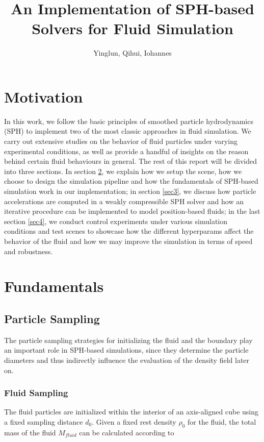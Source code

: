 \documentclass[
	11pt, 
	DIV10,
	ngerman,
	a4paper, 
	oneside, 
	headings=normal, 
	captions=tableheading,
	final, 
	numbers=noenddot
]{scrartcl}
\title{An Implementation of SPH-based Solvers for Fluid Simulation}
\author{Yinglun, Qihui, Iohannes}
\begin{document}
\maketitle


\section{Motivation}

In this work, we follow the basic principles of smoothed particle hydrodynamics (SPH) to implement two of the most classic approaches in fluid simulation. We carry out extensive studies on the behavior of fluid particles under varying experimental conditions, as well as provide a handful of insights on the reason behind certain fluid behaviours in general. The rest of this report will be divided into three sections. In section \ref{sec2}, we explain how we setup the scene, how we choose to design the simulation pipeline and how the fundamentals of SPH-based simulation work in our implementation; in section \ref{sec3}, we discuss how particle accelerations are computed in a weakly compressible SPH solver and how an iterative procedure can be implemented to model position-based fluids; in the last section \ref{sec4}, we conduct control experiments under various simulation conditions and test scenes to showcase how the different hyperparams affect the behavior of the fluid and how we may improve the simulation in terms of speed and robustness.

\section{Fundamentals}
\label{sec2}

\subsection{Particle Sampling}

The particle sampling strategies for initializing the fluid and the boundary play an important role in SPH-based simulations, since they determine the particle diameters and thus indirectly influence the evaluation of the density field later on.

\subsubsection{Fluid Sampling}

The fluid particles are initialized within the interior of an axis-aligned cube using a fixed sampling distance $ d_{0} $. Given a fixed rest density $ \rho_{0} $ for the fluid, the total mass of the fluid $ M_{fluid} $ can be calculated according to
\end{document}
